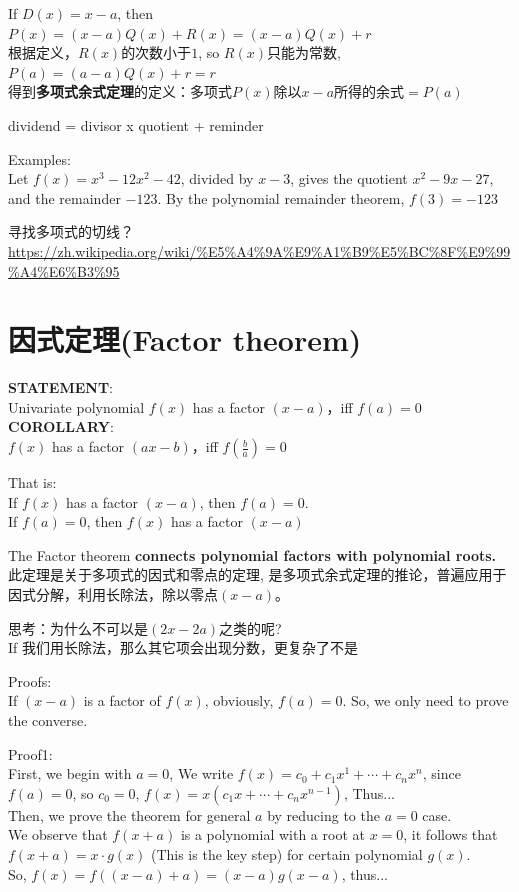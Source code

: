 \documentclass[../main.tex]{subfiles}
\begin{document}
If $D(x)=x-a$, then $P(x)=(x-a)Q(x)+R(x) = (x-a)Q(x)+r$\\
根据定义，$R(x)$的次数小于$1$, so $R(x)$只能为常数, $P(a)=(a-a)Q(x)+r=r$\\
得到\textbf{多项式余式定理}的定义：多项式$P(x)$除以$x-a$所得的余式$=P(a)$

dividend = divisor x quotient + reminder

Examples:\\
Let $f(x)=x^3-12x^2-42$, divided by $x-3$, gives the quotient $x^2-9x-27$, and the remainder $-123$. By the polynomial remainder theorem, $f(3)=-123$

寻找多项式的切线？  \url{https://zh.wikipedia.org/wiki/%E5%A4%9A%E9%A1%B9%E5%BC%8F%E9%99%A4%E6%B3%95}

\section{因式定理(Factor theorem)}
\begin{mdframed}
  \textbf{STATEMENT}:\\
  Univariate polynomial $f(x)$ has a factor $(x-a)$，iff $f(a)=0$\\
  \textbf{COROLLARY}:\\
  $f(x)$ has a factor $(ax-b)$，iff $f(\frac{b}{a})=0$
\end{mdframed}
That is:\\
If $f(x)$ has a factor $(x-a)$, then $f(a)=0$. \\
If $f(a)=0$, then $f(x)$ has a factor $(x-a)$

The Factor theorem \textbf{connects polynomial factors with polynomial roots.}\\
此定理是关于多项式的因式和零点的定理, 是多项式余式定理的推论，普遍应用于因式分解，利用长除法，除以零点$(x-a)$。

思考：为什么不可以是$(2x-2a)$之类的呢?\\
If 我们用长除法，那么其它项会出现分数，更复杂了不是

Proofs:\\
If $(x-a)$ is a factor of $f(x)$, obviously, $f(a)=0$. So, we only need to prove the converse.

Proof1:\\
First, we begin with $a=0$, We write $f(x)=c_0+c_1x^1+\cdots +c_nx^n$, since $f(a)=0$, so $c_0=0$, $f(x)=x(c_1x+\cdots +c_nx^{n-1})$, Thus... \\
Then, we prove the theorem for general $a$ by reducing to the $a=0$ case.\\
We observe that $f(x+a)$ is a polynomial with a root at $x=0$, it follows that $f(x+a)=x\cdot g(x)$ (This is the key step) for certain polynomial $g(x)$.\\
So, $f(x)=f((x-a)+a)=(x-a)g(x-a)$,  thus...
\end{document}
